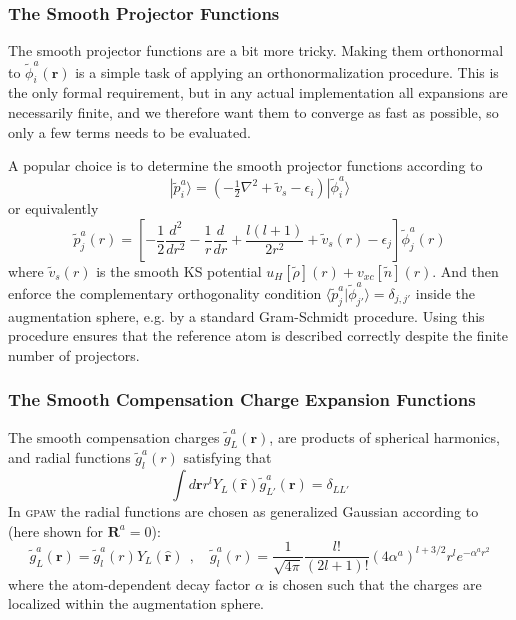 \documentclass[a4paper]{article}
\newcommand{\gpaw}{\textsc{gpaw}}
\newcommand{\f}[1]{\mathbf{#1}}
\newcommand{\s}[1]{\tilde{#1}}
\newcommand{\br}{\mathbf{r}}
\newcommand{\bR}{\mathbf{R}}
\newcommand{\ket}[1]{| #1 \rangle}
\newcommand{\braket}[2]{\langle #1 | #2 \rangle}
\begin{document}
\subsubsection*{The Smooth Projector Functions}
\par The smooth projector functions are a bit more tricky.  Making
them orthonormal to $\s{\phi}_i^a(\f{r})$ is a simple task of applying
an orthonormalization procedure. This is the only formal requirement,
but in any actual implementation all expansions are necessarily
finite, and we therefore want them to converge as fast as possible, so
only a few terms needs to be evaluated.
\par A popular choice is to determine the smooth projector functions
according to
%
\begin{equation}\label{eq: construct projector}
  \ket{\s{p}_i^a} = \left( -\tfrac{1}{2} \nabla^2 + \s{v}_s - \epsilon_i\right) \ket{\s{\phi}^a_i}
\end{equation}
%
or equivalently
%
\begin{equation}
  \s{p}_{j}^a(r) = \left[-\frac{1}{2}\frac{d^2}{dr^2} - \frac{1}{r}\frac{d}{dr} + \frac{l(l+1)}{2r^2} + \s{v}_s(r) - \epsilon_j \right] \s{\phi}^a_j(r)
\end{equation}
%
where $\s{v}_s(r)$ is the smooth KS potential $u_H[\s{\rho}](r) +
v_{xc}[\s{n}](r)$. And then enforce the complementary orthogonality
condition $\braket{\s{p}_{j}^a}{\s{\phi}^a_{j'}} = \delta_{j,j'}$
inside the augmentation sphere, e.g. by a standard Gram-Schmidt
procedure. Using this procedure ensures that the reference atom is
described correctly despite the finite number of projectors.

\subsubsection*{The Smooth Compensation Charge Expansion Functions}\label{sec: choosing comp charge}
The smooth compensation charges $\s{g}_L^a(\br)$, are products of
spherical harmonics, and radial functions $\s{g}_l^a(r)$ satisfying
that
%
\begin{equation}
\int d\f{r} r^l Y_L(\hat{\f{r}})\s{g}_{L'}^a(\f{r}) = \delta_{LL'}
\end{equation}
%
In \gpaw{} the radial functions are chosen as generalized Gaussian
according to (here shown for $\bR^a=0$):
%
\begin{equation}\label{eq: generalized gaussians}
\s{g}_L^a(\f{r}) = \s{g}_l^a(r) Y_L(\hat{\f{r}})~~,\quad
\s{g}_l^a(r) = \frac{1}{\sqrt{4\pi}}\frac{l!}{(2l+1)!}(4\alpha^a)^{l+3/2}r^le^{-\alpha^ar^2}
\end{equation}
%
where the atom-dependent decay factor $\alpha$ is chosen such that
the charges are localized within the augmentation sphere.
\end{document}

